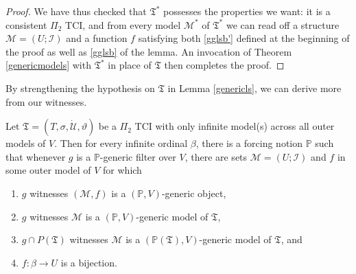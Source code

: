 \documentclass[12pt]{article}
\numberwithin{equation}{section}
\begin{document}
\begin{proof}
We have thus checked that $\mathfrak{T}^*$ possesses the properties we want: it is a consistent $\Pi_2$ TCI, and from every model $\mathcal{M}^*$ of $\mathfrak{T}^*$ we can read off a structure $\mathcal{M} = (U; \mathcal{I})$ and a function $f$ satisfying both \ref{gglsb'} defined at the beginning of the proof as well as \ref{gglsb} of the lemma. An invocation of Theorem \ref{genericmodels} with $\mathfrak{T^*}$ in place of $\mathfrak{T}$ then completes the proof.
\end{proof}

By strengthening the hypothesis on $\mathfrak{T}$ in Lemma \ref{genericls}, we can derive more from our witnesses.

\begin{lem}\label{genericlscor}
Let $\mathfrak{T} = (T, \sigma, \dot{\mathcal{U}}, \vartheta)$ be a $\Pi_2$ TCI with only infinite model(s) across all outer models of $V$. Then for every infinite ordinal $\beta$, there is a forcing notion $\mathbb{P}$ such that whenever $g$ is a $\mathbb{P}$-generic filter over $V$, there are sets $\mathcal{M} = (U; \mathcal{I})$ and $f$ in some outer model of $V$ for which  
\begin{enumerate}[label=(\alph*)]
    \item $g$ witnesses $(\mathcal{M}, f)$ is a $(\mathbb{P}, V)$-generic object, 
    \item $g$ witnesses $\mathcal{M}$ is a $(\mathbb{P}, V)$-generic model of $\mathfrak{T}$,
    \item $g \cap P(\mathfrak{T})$ witnesses $\mathcal{M}$ is a $(\mathbb{P}(\mathfrak{T}), V)$-generic model of $\mathfrak{T}$, and
    \item $f : \beta \longrightarrow U$ is a bijection.
\end{enumerate}
\end{lem}
\end{document}
